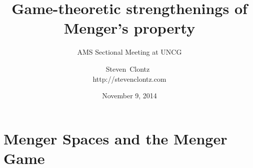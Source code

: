 \documentclass{beamer}
\title
{Game-theoretic strengthenings of Menger's property}
\subtitle
{AMS Sectional Meeting at UNCG} %
\author%
{Steven~Clontz~\\http://stevenclontz.com}%
\institute[Auburn University] %
{
  Department of Mathematics and Statistics\\
  Auburn University}
\date[14-11-09] %
{November 9, 2014}
\theoremstyle{definition}
\newcommand{\<}{\langle}
\renewcommand{\>}{\rangle}
\begin{document}
\newcommand{\vpause}{\pause\vspace{1em}}

\begin{frame}
  \titlepage
\end{frame}








\section{Menger Spaces and the Menger Game}
\end{document}
